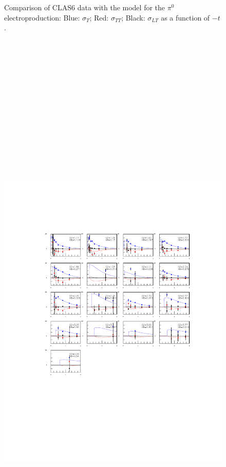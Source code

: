 \documentclass[prc,floatfix,superscriptaddress]{revtex4}
\begin{document}
\begin{figure}[t!]
{\label{pi0_sf}
}
\vspace*{-70mm}
\caption{Comparison of CLAS6 data with the model for the $\pi^0$ electroproduction:
Blue: $\sigma_T$;
Red: $\sigma_{TT}$;
Black: $\sigma_{LT}$ as a function of $-t$.
}
\label{fig:pi0_sf}
\end{figure}


\begin{figure}[t!]
\vspace*{-10 mm}
\centerline{
\includegraphics[height=30cm]{../Test_plots/eta_sf.pdf}
}
\end{figure}
\end{document}
